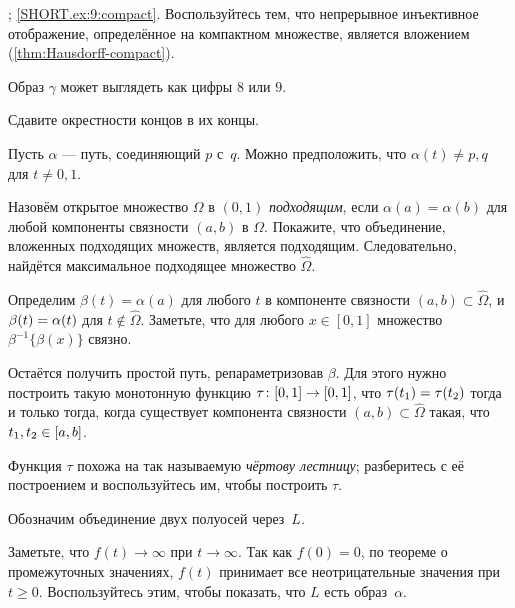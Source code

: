 \setcounter{eqtn}{0}

\raggedcolumns\setlength{\multicolsep}{-4mm}
\begin{multicols}{2}


\setcounter{eqtn}{0}

\parbf{\ref{ex:9}}; \ref{SHORT.ex:9:compact}.
Воспользуйтесь тем, что непрерывное инъективное отображение, определённое на компактном множестве, является вложением (\ref{thm:Hausdorff-compact}).

Образ $\gamma$ может выглядеть как цифры $8$ или $9$.

Сдавите окрестности концов в их концы.

Пусть $\alpha$ --- путь, соединяющий $p$ с~$q$.
Можно предположить, что $\alpha(t)\ne p,q$ для $t\ne0,1$.

Назовём открытое множество $\Omega$ в $(0,1)$ {}\emph{подходящим},
если $\alpha(a)=\alpha(b)$ для любой компоненты связности $(a,b)$ в $\Omega$.
Покажите, что объединение, вложенных подходящих множеств, является подходящим.
Следовательно, найдётся максимальное подходящее множество $\hat \Omega$.

Определим $\beta(t)=\alpha(a)$ для любого $t$ в компоненте связности $(a,b)\subset\hat \Omega$, и $\beta (t) \z= \alpha (t) $ для $t\notin\hat{\Omega}$.
Заметьте, что для любого $x\in [0,1]$ множество $\beta^{-1}\{\beta(x)\}$ связно.


Остаётся получить простой путь, репараметризовав $\beta$.
Для этого нужно построить такую монотонную функцию $\tau\:[0,1]\z\to[0,1]$, что 
$\tau(t_1)\z=\tau(t_2)$ тогда и только тогда, когда существует компонента связности $(a,b)\subset\hat \Omega$ такая, что $t_1,t_2\z\in [a,b]$.

Функция $\tau$ похожа на так называемую {}\emph{чёртову лестницу};
разберитесь с её построением и воспользуйтесь им, чтобы построить $\tau$.

Обозначим объединение двух полуосей через~$L$.

Заметьте, что $f(t)\to\infty$ при $t\to \infty$.
Так как $f(0)=0$, по теореме о промежуточных значениях, $f(t)$ принимает все неотрицательные значения при $t\ge 0$.
Воспользуйтесь этим, чтобы показать, что $L$ есть образ~$\alpha$.


\end{multicols}
